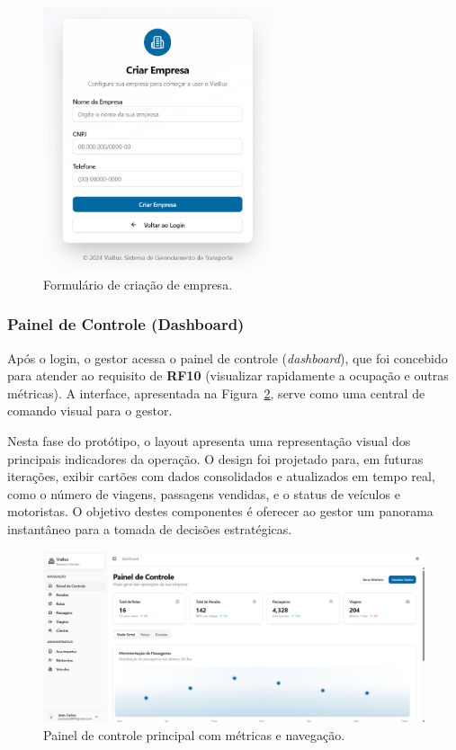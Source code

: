 \begin{figure}[H]
  \centering
  \includegraphics[width=0.6\textwidth]{imagens/criacao-empresa.png}
  \caption{Formulário de criação de empresa.}
  \label{fig:criacao-empresa}
\end{figure}

\subsubsection{Painel de Controle (Dashboard)}
Após o login, o gestor acessa o painel de controle (\textit{dashboard}), que foi concebido para atender ao requisito de \textbf{RF10} (visualizar rapidamente a ocupação e outras métricas). A interface, apresentada na Figura~\ref{fig:dashboard}, serve como uma central de comando visual para o gestor.

Nesta fase do protótipo, o layout apresenta uma representação visual dos principais indicadores da operação. O design foi projetado para, em futuras iterações, exibir cartões com dados consolidados e atualizados em tempo real, como o número de viagens, passagens vendidas, e o status de veículos e motoristas. O objetivo destes componentes é oferecer ao gestor um panorama instantâneo para a tomada de decisões estratégicas.

\begin{figure}[H]
  \centering
  \includegraphics[width=1\textwidth]{imagens/dashboard.png}
  \caption{Painel de controle principal com métricas e navegação.}
  \label{fig:dashboard}
\end{figure}

